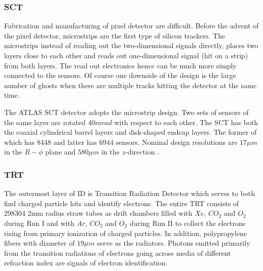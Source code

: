 \subsubsection{SCT}

Fabrication and manufacturing of pixel detector are difficult. Before the advent of the pixel detector, microstrips are the first type of silicon trackers. The microstrips instead of reading out the two-dimensional signals directly, places two layers close to each other and reads out one-dimensional signal (hit on a strip) from both layers. The read out electronics hence can be much more simply connected to the sensors. Of course one downside of the design is the large number of ghosts when there are multiple tracks hitting the detector at the same time.

The ATLAS SCT detector adopts the microstrip design. Two sets of sensors of the same layer are rotated 40$mrad$ with respect to each other. The SCT has both the coaxial cylindrical barrel layers and disk-shaped endcap layers. The former of which has 8448 and latter has 6944 sensors\cite{SCTpaper}. Nominal design resolutions are $17\mu m$ in the $R-\phi$ plane and $580 \mu m$ in the $z$-direction \cite{PERF-2007-01}.


\subsubsection{TRT}

The outermost layer of ID is Transition Radiation Detector which serves to both find charged particle hits and identify electrons. The entire TRT consists of 298304 2mm radius straw tubes\cite{TRTpaper} as drift chambers filled with $Xe$, $CO_2$ and $O_2$ during Run I and with $Ar$, $CO_2$ and $O_2$ during Run II to collect the electrons rising from primary ionization of charged particles. In addition, polypropylene fibers with diameter of $19\mu m$ serve as the radiators. Photons emitted primarily from the transition radiations of electrons going across media of different refraction index are signals of electron identification.
